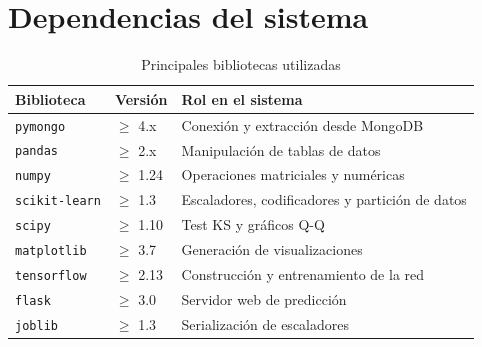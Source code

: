 \documentclass[12pt, a4paper]{report}
\begin{document}
\appendix
\chapter{Dependencias del sistema}

\begin{table}[H]
\centering
\caption{Principales bibliotecas utilizadas}
\label{tab:dependencias}
\begin{tabular}{@{} l l p{6.5cm} @{}}
\toprule
\textbf{Biblioteca} & \textbf{Versión} & \textbf{Rol en el sistema} \\
\midrule
\texttt{pymongo}     & $\geq$ 4.x  & Conexión y extracción desde MongoDB \\
\texttt{pandas}      & $\geq$ 2.x  & Manipulación de tablas de datos \\
\texttt{numpy}       & $\geq$ 1.24 & Operaciones matriciales y numéricas \\
\texttt{scikit-learn}& $\geq$ 1.3  & Escaladores, codificadores y partición de datos \\
\texttt{scipy}       & $\geq$ 1.10 & Test KS y gráficos Q-Q \\
\texttt{matplotlib}  & $\geq$ 3.7  & Generación de visualizaciones \\
\texttt{tensorflow}  & $\geq$ 2.13 & Construcción y entrenamiento de la red \\
\texttt{flask}       & $\geq$ 3.0  & Servidor web de predicción \\
\texttt{joblib}      & $\geq$ 1.3  & Serialización de escaladores \\
\bottomrule
\end{tabular}
\end{table}
\end{document}
